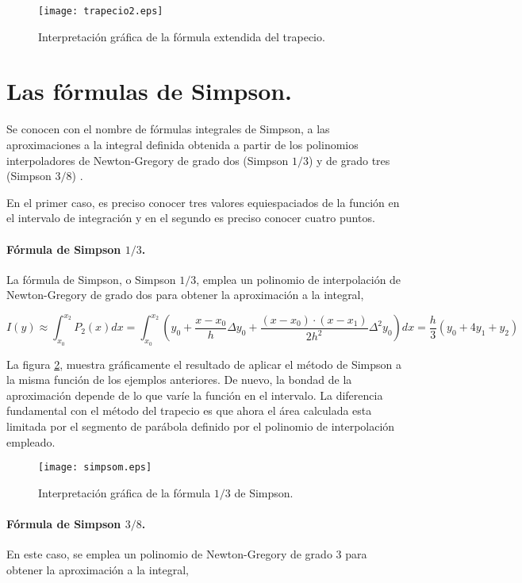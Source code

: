 \begin{figure}[h]
\centering
\texttt{[image: trapecio2.eps]}
\caption{Interpretación gráfica de la fórmula extendida del trapecio.} 
\label{fig:trapecio2}
\end{figure}

\section{Las fórmulas de Simpson.}
Se conocen con el nombre de fórmulas integrales de Simpson, a las aproximaciones a la integral definida obtenida a partir de los polinomios interpoladores de Newton-Gregory de grado dos (Simpson $1/3$) y de grado tres (Simpson $3/8$) . 

En el primer caso, es preciso conocer tres valores equiespaciados de la función en el intervalo de integración y en el segundo es preciso conocer cuatro puntos. 

\paragraph*{Fórmula de Simpson $1/3$.} La fórmula de Simpson, o Simpson $1/3$,  emplea un polinomio de interpolación de Newton-Gregory de grado dos para  obtener la aproximación a la integral,

\begin{equation*}
I(y)\approx \int_{x_0}^{x_2}P_2(x)dx=\int_{x_0}^{x_2}\left(y_0+\frac{x-x_0}{h}\Delta y_0+\frac{(x-x_0)\cdot(x-x_1)}{2h^2}\Delta^2 y_0 \right)dx= \frac{h}{3}(y_0+4y_1+y_2)
\end{equation*}

La figura \ref{fig:simpsom}, muestra gráficamente el resultado de aplicar el método de Simpson a la misma función de los ejemplos anteriores.  De nuevo, la bondad de la aproximación depende de lo que varíe la función en el intervalo.  La diferencia fundamental con el método del trapecio es que ahora el área calculada esta limitada por el segmento de parábola definido por el polinomio de interpolación empleado.

\begin{figure}[h]
\centering
\texttt{[image: simpsom.eps]}
\caption{Interpretación gráfica de la fórmula $1/3$ de Simpson.} 
\label{fig:simpsom}
\end{figure}

\paragraph*{Fórmula de Simpson $3/8$.} En este caso, se emplea un polinomio de Newton-Gregory de grado 3 para obtener la aproximación a la integral,

